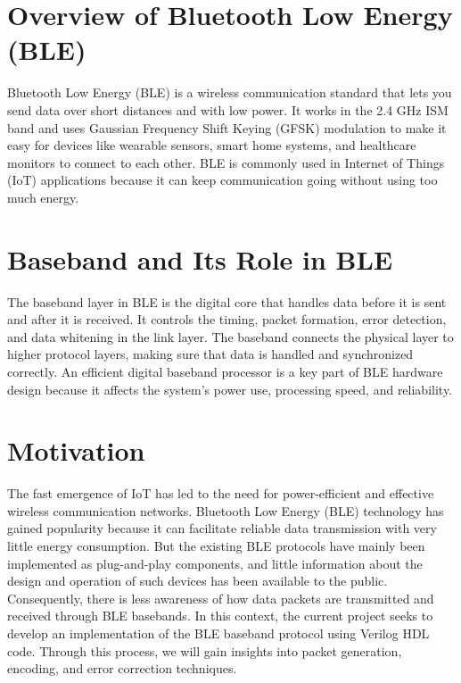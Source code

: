 \documentclass[12pt,singleside,a4paper]{report}
\begin{document}
\section{Overview of Bluetooth Low Energy (BLE)}
Bluetooth Low Energy (BLE) is a wireless communication standard that lets you send data over short distances and with low power. It works in the 2.4 GHz ISM band and uses Gaussian Frequency Shift Keying (GFSK) modulation to make it easy for devices like wearable sensors, smart home systems, and healthcare monitors to connect to each other. BLE is commonly used in Internet of Things (IoT) applications because it can keep communication going without using too much energy.

\section{Baseband and Its Role in BLE}
The baseband layer in BLE is the digital core that handles data before it is sent and after it is received. It controls the timing, packet formation, error detection, and data whitening in the link layer. The baseband connects the physical layer to higher protocol layers, making sure that data is handled and synchronized correctly. An efficient digital baseband processor is a key part of BLE hardware design because it affects the system's power use, processing speed, and reliability.

\section{Motivation}
The fast emergence of IoT has led to the need for power-efficient and effective wireless communication networks. Bluetooth Low Energy (BLE) technology has gained popularity because it can facilitate reliable data transmission with very little energy consumption. But the existing BLE protocols have mainly been implemented as plug-and-play components, and little information about the design and operation of such devices has been available to the public. Consequently, there is less awareness of how data packets are transmitted and received through BLE basebands. In this context, the current project seeks to develop an implementation of the BLE baseband protocol using Verilog HDL code. Through this process, we will gain insights into packet generation, encoding, and error correction techniques.
\end{document}
